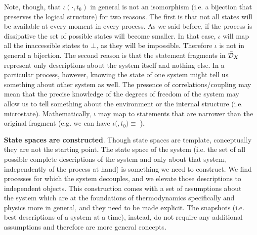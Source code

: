 \documentclass[10pt, onecolumn, longbibliography, nofootinbib]{revtex4-2}
\begin{document}
Note, though, that $\iota( \cdot, t_0)$ in general is not an isomorphism (i.e. a bijection that preserves the logical structure) for two reasons. The first is that not all states will be available at every moment in every process. As we said before, if the process is dissipative the set of possible states will become smaller. In that case, $\iota$ will map all the inaccessible states to $\bot$, as they will be impossible. Therefore $\iota$ is not in general a bijection. The second reason is that the statement fragments in $\bar{\mathcal{D}}_{X}$ represent only descriptions about the system itself and nothing else. In a particular process, however, knowing the state of one system might tell us something about other system as well. The presence of correlations/coupling may mean that the precise knowledge of the degrees of freedom of the system may allow us to tell something about the environment or the internal structure (i.e. microstate). Mathematically, $\iota$ may map to statements that are narrower than the original fragment (e.g. we can have $\iota($$, t_0) \equiv$ ).

\textbf{State spaces are constructed}. Though state spaces are template, conceptually they are not the starting point. The state space of the system (i.e. the set of all possible complete descriptions of the system and only about that system, independently of the process at hand) is something we need to construct. We find processes for which the system decouples, and we elevate those descriptions to independent objects. This construction comes with a set of assumptions about the system which are at the foundations of thermodynamics specifically and physics more in general, and they need to be made explicit. The snapshots (i.e. best descriptions of a system at a time), instead, do not require any additional assumptions and therefore are more general concepts.
\end{document}
